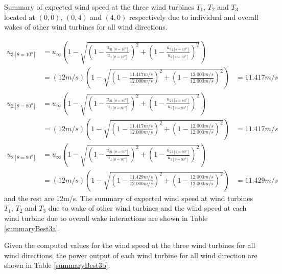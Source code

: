 \begin{table}[H]
	    \caption{Summary of expected wind speed at the three wind turbines $T_1$, $T_2$ and $T_3$ located at $(0,0)$, $(0,4)$ and $(4,0)$ respectively due to individual and overall wakes of other wind turbines for all wind directions.}
	    \label{summaryBest3a}
	\end{table}
	\doublespacing
	
	\begin{align*}
	    u_{3[\theta=10^o]} &= u_\infty\left( 1-\sqrt{\left( 1-\frac{u_{31[\theta=10^o]}}{u_{1[\theta=10^o]}} \right)^2 + \left( 1-\frac{u_{32[\theta=10^o]}}{u_{2[\theta=10^o]}} \right)^2} \right) \\
	    &= (12m/s)\left( 1-\sqrt{\left( 1-\frac{11.417m/s}{12.000m/s} \right)^2 + \left( 1-\frac{12.000m/s}{12.000m/s} \right)^2} \right)
	    &=11.417m/s
	\end{align*}
	\begin{align*}
	    u_{2[\theta=80^o]} &= u_\infty\left( 1-\sqrt{\left( 1-\frac{u_{21[\theta=80^o]}}{u_{1[\theta=80^o]}} \right)^2 + \left( 1-\frac{u_{23[\theta=80^o]}}{u_{3[\theta=80^o]}} \right)^2} \right) \\
	    &= (12m/s)\left( 1-\sqrt{\left( 1-\frac{11.417m/s}{12.000m/s} \right)^2 + \left( 1-\frac{12.000m/s}{12.000m/s} \right)^2} \right)
	    &=11.417m/s
	\end{align*}
	\begin{align*}
	    u_{2[\theta=90^o]} &= u_\infty\left( 1-\sqrt{\left( 1-\frac{u_{21[\theta=90^o]}}{u_{1[\theta=90^o]}} \right)^2 + \left( 1-\frac{u_{23[\theta=90^o]}}{u_{3[\theta=90^o]}} \right)^2} \right) \\
	    &= (12m/s)\left( 1-\sqrt{\left( 1-\frac{11.429m/s}{12.000m/s} \right)^2 + \left( 1-\frac{12.000m/s}{12.000m/s} \right)^2} \right)
	    &=11.429m/s
	\end{align*}
	and the rest are 12m/s. The summary of expected wind speed at wind turbines $T_1$, $T_2$ and $T_3$ due to wake of other wind turbines and the wind speed at each wind turbine due to overall wake interactions are shown in Table \ref{summaryBest3a}.
	
	Given the computed values for the wind speed at the three wind turbines for all wind directions, the power output of each wind turbine for all wind direction are shown in Table \ref{summaryBest3b}.
	
